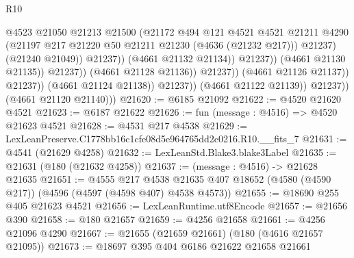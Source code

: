 \begin{lexlean}{R10}
\begin{coremodule}
                                                  @4523
                                                  @21050
                                                  @21213
                                                  @21500
                                                  (@21172
                                                    @494
                                                    @121
                                                    @4521
                                                    @4521
                                                    @21211
                                                    @4290
                                                    (@21197
                                                      @217
                                                      @21220
                                                      @50
                                                      @21211
                                                      @21230
                                                      (@4636 (@21232 @217)))
                                                    @21237)
                                                  (@21240 @21049))
                                                @21237))
                                            (@4661 @21132 @21134))
                                          @21237))
                                      (@4661 @21130 @21135))
                                    @21237))
                                (@4661 @21128 @21136))
                              @21237))
                          (@4661 @21126 @21137))
                        @21237))
                    (@4661 @21124 @21138))
                  @21237))
              (@4661 @21122 @21139))
            @21237))
        (@4661 @21120 @21140)))
@21620 := @6185 @21092
@21622 := @4520 @21620 @4521
@21623 := @6187 @21622
@21626 := fun (message : @4516) => @4520 @21623 @4521
@21628 := @4531 @217 @4538
@21629 := LexLeanPreserve.C1778bb16c1cfe08d5e964765dd2c0216.R10.__fits_7
@21631 := @4541 (@21629 @4258)
@21632 := LexLeanStd.Blake3.blake3Label
@21635 := @21631 (@180 (@21632 @4258))
@21637 := (message : @4516) -> @21628 @21635
@21651 := @4555
    @217
    @4538
    @21635
    @407
    @18652
    (@4580 (@4590 @217))
    (@4596 (@4597 (@4598 @407) @4538 @4573))
@21655 := @18690 @255 @405 @21623 @4521
@21656 := LexLeanRuntime.utf8Encode
@21657 := @21656 @390
@21658 := @180 @21657
@21659 := @4256 @21658
@21661 := @4256 @21096 @4290
@21667 := @21655 (@21659 @21661) (@180 (@4616 @21657 @21095))
@21673 := @18697 @395 @404 @6186 @21622 @21658 @21661

\end{coremodule}
\end{lexlean}
